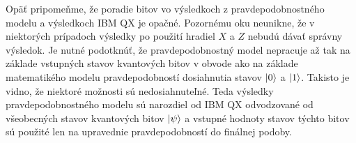 Opäť pripomeňme, že poradie bitov vo výsledkoch z pravdepodobnostného modelu
a výsledkoch IBM QX je opačné. Pozornému oku neunikne, že v niektorých 
prípadoch výsledky po použití hradiel \(X\) a \(Z\) nebudú dávať správny 
výsledok. Je nutné podotknúť, že pravdepodobnostný model nepracuje až tak 
na základe vstupných stavov kvantových bitov v obvode ako na základe
matematikého modelu pravdepodobností dosiahnutia stavov \(\ket{0}\) a 
\(\ket{1}\). Takisto je vidno, že niektoré možnosti sú nedosiahnuteľné.
Teda výsledky pravdepodobnostného modelu sú narozdiel od IBM QX odvodzované od
všeobecných stavov kvantových bitov \(\ket{\psi}\) a vstupné hodnoty stavov
týchto bitov sú použité len na upravednie pravdepodobností do finálnej podoby.

